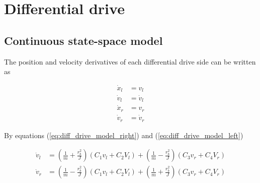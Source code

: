 \section{Differential drive}

\subsection{Continuous state-space model}

The position and velocity derivatives of each differential drive side can be
written as

\begin{align}
  \dot{x}_l &= v_l \label{eq:diff_drive_cont_ss_posl} \\
  \dot{v}_l &= \dot{v}_l \label{eq:diff_drive_cont_ss_vell} \\
  \dot{x}_r &= v_r \label{eq:diff_drive_cont_ss_posr} \\
  \dot{v}_r &= \dot{v}_r \label{eq:diff_drive_cont_ss_velr}
\end{align}

By equations (\ref{eq:diff_drive_model_right}) and
(\ref{eq:diff_drive_model_left})

\begin{align*}
  \dot{v}_l &= \left(\frac{1}{m} + \frac{r_b^2}{J}\right)
    \left(C_1 v_l + C_2 V_l\right) +
    \left(\frac{1}{m} - \frac{r_b^2}{J}\right) \left(C_3 v_r + C_4 V_r\right) \\
  \dot{v}_r &= \left(\frac{1}{m} - \frac{r_b^2}{J}\right)
    \left(C_1 v_l + C_2 V_l\right) +
    \left(\frac{1}{m} + \frac{r_b^2}{J}\right) \left(C_3 v_r + C_4 V_r\right)
\end{align*}

